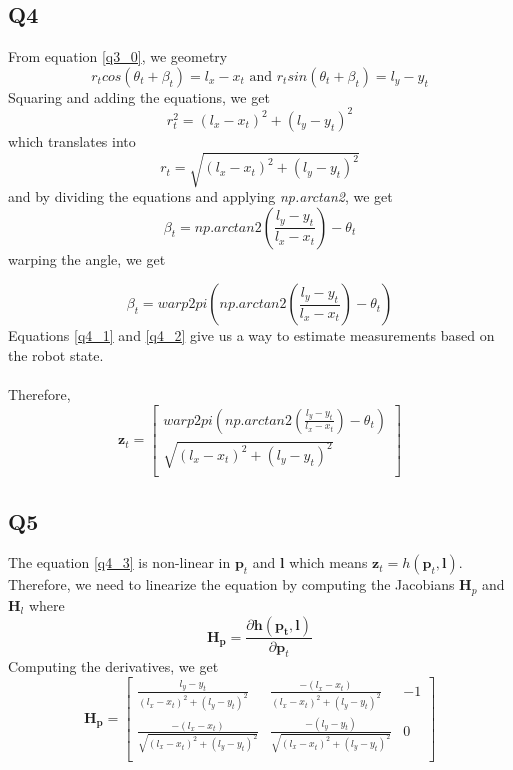 \documentclass[12pt, a4paper]{article}
\begin{document}
\subsection{Q4}
From equation \ref{q3_0}, we geometry
\[r_tcos(\theta_t + \beta_t) = l_x - x_t \text{ and } r_tsin(\theta_t + \beta_t) = l_y - y_t\]
Squaring and adding the equations, we get
\[r_t^2 = (l_x - x_t)^2 + (l_y - y_t)^2\]
which translates into
\begin{equation}
  \label{q4_1}
  r_t = \sqrt{(l_x - x_t)^2 + (l_y - y_t)^2}
\end{equation}
and by dividing the equations and applying \textit{np.arctan2}, we get
\[\beta_t = \textit{np.arctan2}\left(\frac{l_y - y_t}{l_x - x_t}\right) - \theta_t\]
warping the angle, we get

\begin{equation}
  \label{q4_2}  
  \beta_t = \textit{warp2pi}\left(\textit{np.arctan2}\left(\frac{l_y - y_t}{l_x - x_t}\right) - \theta_t\right)
\end{equation}
Equations \ref{q4_1} and \ref{q4_2} give us a way to estimate measurements based on the robot state.\\\\
Therefore,
\begin{equation}
  \label{q4_3}
  \mathbf{z}_t = \begin{bmatrix}
    \textit{warp2pi}\left(\textit{np.arctan2}\left(\frac{l_y - y_t}{l_x - x_t}\right) - \theta_t\right)\\
    \sqrt{(l_x - x_t)^2 + (l_y - y_t)^2}\\
  \end{bmatrix}
\end{equation} 
\subsection{Q5}
The equation \ref{q4_3} is non-linear in $\mathbf{p}_t$ and $\mathbf{l}$ which means $\mathbf{z}_t = h(\mathbf{p}_t, \mathbf{l})$. Therefore, we need to linearize the equation by computing the Jacobians $\mathbf{H}_p$ and $\mathbf{H}_l$ where
\[\mathbf{H_p} = \frac{\partial \mathbf{h(\mathbf{p}_t, \mathbf{l})}}{\partial\mathbf{p}_t}\]
Computing the derivatives, we get
\[\mathbf{H_p} = \begin{bmatrix}
  \frac{l_y - y_t}{(l_x - x_t)^2 + (l_y - y_t)^2} & \frac{-(l_x - x_t)}{(l_x - x_t)^2 + (l_y - y_t)^2} & - 1\\
  \frac{-(l_x - x_t)}{\sqrt{(l_x - x_t)^2 + (l_y - y_t)^2}} & \frac{-(l_y - y_t)}{\sqrt{(l_x - x_t)^2 + (l_y - y_t)^2}} & 0\\
\end{bmatrix}\]
\end{document}
